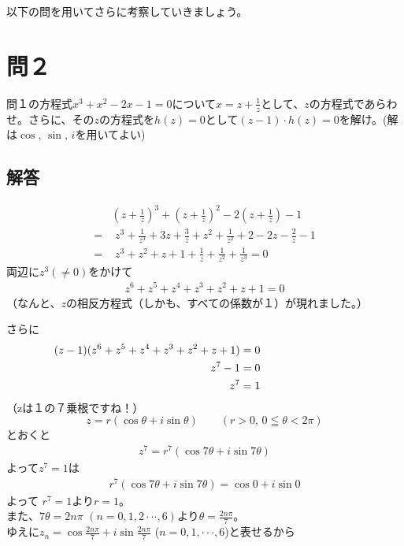 以下の問を用いてさらに考察していきましょう。

%
\section*{問２}

\begin{screen}
問１の方程式$x^3+x^2-2x-1 =0$について$x =z + \frac{1}{z}$として、$z$の方程式であらわせ。さらに、その$z$の方程式を$h(z) = 0$として$(z-1)\cdot h(z) = 0$を解け。(解は$\cos,\, \sin,\, i$を用いてよい)
\end{screen}
%
\subsection*{解答}
\vspace{-10mm}
\begin{align*}
  & \left(z+\frac{1}{z}\right)^3+\left(z+\frac{1}{z}\right)^2-2\left(z+\frac{1}{z}\right)-1\\
  =& \,\, z^3+\frac{1}{z^3}+3z+\frac{3}{z}+z^2+\frac{1}{z^2} +2-2z -\frac{2}{z} -1\\
  =& \,\, z^3+z^2+z+1+\frac{1}{z} +\frac{1}{z^2}+\frac{1}{z^3} = 0
\end{align*}
両辺に$z^3(\neq 0)$をかけて
\begin{eqnarray*}
  z^6 + z^5 + z^4 + z^3 + z^2 +z + 1 = 0
\end{eqnarray*}
（なんと、$z$の相反方程式（しかも、すべての係数が１）が現れました。）\par
さらに
\begin{align*}\hspace{-30mm}
  (z-1)(z^6+z^5+z^4+z^3+z^2+z+1) &= 0\\
  z^7 -1 &= 0\\
  z^7 &= 1
\end{align*}
（zは１の７乗根ですね！）
$$ z = r(\cos \theta + i\sin \theta) \qquad (r>0,\, 0\leqq \theta < 2\pi) $$
とおくと
\begin{eqnarray*}
z^7 = r^7(\cos 7\theta + i\sin 7\theta)
\end{eqnarray*}
よって$z^7 = 1$は
\begin{eqnarray*}
r^7(\cos 7\theta + i\sin 7\theta) = \cos 0 + i\sin 0
\end{eqnarray*}
よって
$r^7 = 1$より$r=1$。\\
また、$7 \theta = 2n\pi \,\, (n = 0,1,2 \cdot \cdot \cdot ,6)$より$\theta = \frac{2n\pi}{7}$。\\
ゆえに$z_n = \cos\frac{2n\pi}{7} + i\sin\frac{2n\pi}{7}$\,\,($n = 0,1,\cdot \cdot \cdot,6$)と表せるから
